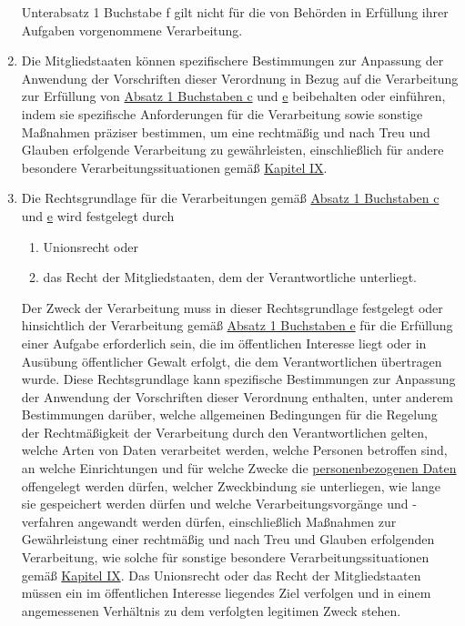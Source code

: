 \begin{enumerate}
\begin{enumerate}
  \end{enumerate}

  Unterabsatz 1 Buchstabe f gilt nicht für die von Behörden in Erfüllung ihrer Aufgaben vorgenommene Verarbeitung.

  \item Die Mitgliedstaaten können spezifischere Bestimmungen zur Anpassung der Anwendung der Vorschriften dieser
   Verordnung in Bezug auf die Verarbeitung zur Erfüllung von \hyperref[itm:06-1c]{Absatz 1 Buchstaben c} und \hyperref
   [itm:06-1e]{e} beibehalten oder einführen, indem sie spezifische Anforderungen für die Verarbeitung sowie sonstige
   Maßnahmen präziser bestimmen, um eine rechtmäßig und nach Treu und Glauben erfolgende Verarbeitung zu gewährleisten,
   einschließlich für andere besondere Verarbeitungssituationen gemäß \hyperref[part:9]{Kapitel IX}.
  \label{itm:06-2}

  \item Die Rechtsgrundlage für die Verarbeitungen gemäß \hyperref[itm:06-1c]{Absatz 1 Buchstaben c} und \hyperref
   [itm:06-1e]{e} wird festgelegt durch
  \label{itm:06-3}

  \begin{enumerate}
  
    \item Unionsrecht oder
    \label{itm:06-3a}

    \item das Recht der Mitgliedstaaten, dem der Verantwortliche unterliegt.
    \label{itm:06-3b}

  \end{enumerate}

  Der Zweck der Verarbeitung muss in dieser Rechtsgrundlage festgelegt oder hinsichtlich der Verarbeitung gemäß
  \hyperref[itm:06-1e]{Absatz 1 Buchstaben e} für die Erfüllung einer Aufgabe erforderlich sein, die im öffentlichen
   Interesse liegt oder in Ausübung öffentlicher Gewalt erfolgt, die dem Verantwortlichen übertragen wurde. Diese
   Rechtsgrundlage kann spezifische Bestimmungen zur Anpassung der Anwendung der Vorschriften dieser Verordnung
   enthalten, unter anderem Bestimmungen darüber, welche allgemeinen Bedingungen für die Regelung der Rechtmäßigkeit
   der Verarbeitung durch den Verantwortlichen gelten, welche Arten von Daten verarbeitet werden, welche Personen
   betroffen sind, an welche Einrichtungen und für welche Zwecke die \hyperref[itm:04-1]{personenbezogenen Daten} offengelegt werden dürfen,
   welcher Zweckbindung sie unterliegen, wie lange sie gespeichert werden dürfen und welche Verarbeitungsvorgänge
   und -verfahren angewandt werden dürfen, einschließlich Maßnahmen zur Gewährleistung einer rechtmäßig und nach Treu
   und Glauben erfolgenden Verarbeitung, wie solche für sonstige besondere Verarbeitungssituationen gemäß \hyperref
   [part:9]{Kapitel IX}. Das Unionsrecht oder das Recht der Mitgliedstaaten müssen ein im öffentlichen Interesse
   liegendes Ziel verfolgen und in einem angemessenen Verhältnis zu dem verfolgten legitimen Zweck stehen.


\end{enumerate}
